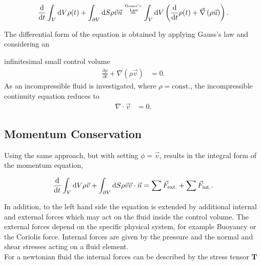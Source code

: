\begin{align}
    \frac{\mathop{}\!\mathrm{d}}{\mathop{}\!\mathrm{d} t} \int_V \mathop{}\!\mathrm{d} V \rho(t) + \int_{\partial V}\mathop{}\!\mathrm{d} S \rho \vec{v}\vec{n}
     \stackrel{\text{Gauss's} \atop \text{ Law}}{=}
    \int_V \mathop{}\!\mathrm{d} V \left( \frac{\mathop{}\!\mathrm{d}}{\mathop{}\!\mathrm{d} t} \rho(t) + \vec{\nabla}\left(\rho \vec{u}\right)\right).
\end{align}

The differential form of the equation is obtained by applying Gauss's law and considering an

infinitesimal small control volume
\begin{align}
     \frac{\partial \rho}{\partial t}  + \nabla \left(\rho \vec{v}\right) &= 0.
\end{align}
As an incompressible fluid is investigated, where $\rho = \text{const.}$, the incompressible continuity equation reduces to
\begin{align}
     \nabla \cdot \vec{v} &= 0.
\end{align}

\subsection{Momentum Conservation}

Using the same approach, but with setting $\phi = \vec{v}$, results in the integral form of the momentum equation,

\begin{align}
    \label{theorie:intimpulse}
    \frac{\mathop{}\!\mathrm{d}}{\mathop{}\!\mathrm{d} t} \int_V \mathop{}\!\mathrm{d} V \rho \vec{v} + \int_{\partial V} \mathop{}\!\mathrm{d} S \rho\vec{v}\vec{v}\cdot \vec{n}  =  \sum \vec{F}_{\text{ext.}} + \sum \vec{F}_{\text{int.}}.
\end{align}

In addition, to the left hand side the equation is extended by additional internal and external forces which may act on the fluid inside the control volume.
The external forces depend on the specific physical system, for example Buoyancy or the Coriolis force. Internal forces
are given by the pressure and the normal and shear stresses acting on a fluid element.\\
For a newtonian fluid the internal forces can be described by the stress tensor $\bm{T}$

